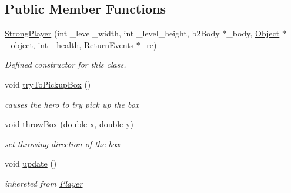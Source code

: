 \subsection*{Public Member Functions}
\begin{DoxyCompactItemize}
\item 
\hyperlink{class_strong_player_ad8c557c1ae5ada0ce8676c601b16653d}{Strong\+Player} (int \+\_\+level\+\_\+width, int \+\_\+level\+\_\+height, b2\+Body $\ast$\+\_\+body, \hyperlink{class_object}{Object} $\ast$\+\_\+object, int \+\_\+health, \hyperlink{_events_8h_a51620cf702f1b8fdf47cd0a5cfa0ba4f}{Return\+Events} $\ast$\+\_\+re)
\begin{DoxyCompactList}\small\item\em Defined constructor for this class. \end{DoxyCompactList}\item 
\mbox{\label{class_strong_player_acdae803bf66f620bc73b105ca06c46ab}} 
void \hyperlink{class_strong_player_acdae803bf66f620bc73b105ca06c46ab}{try\+To\+Pickup\+Box} ()
\begin{DoxyCompactList}\small\item\em causes the hero to try pick up the box \end{DoxyCompactList}\item 
void \hyperlink{class_strong_player_afb33164ecdb89f91cb32c9b59c6805d1}{throw\+Box} (double x, double y)
\begin{DoxyCompactList}\small\item\em set throwing direction of the box \end{DoxyCompactList}\item 
\mbox{\label{class_strong_player_a2e9ec64367e36c1bef0e30293706c1ab}} 
void \hyperlink{class_strong_player_a2e9ec64367e36c1bef0e30293706c1ab}{update} ()
\begin{DoxyCompactList}\small\item\em inhereted from \hyperlink{class_player}{Player} \end{DoxyCompactList}\end{DoxyCompactItemize}
